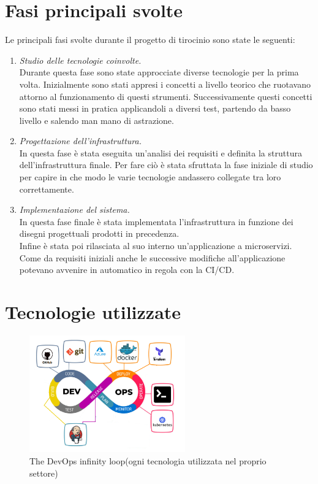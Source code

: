 \documentclass[a4paper,12pt]{report}
\begin{document}
\section{Fasi principali svolte}
Le principali fasi svolte durante il progetto di tirocinio sono state le seguenti:
\begin{enumerate}
\item \textit{Studio delle tecnologie coinvolte.} \\
Durante questa fase sono state approcciate diverse tecnologie per la prima volta. Inizialmente sono stati appresi i concetti a livello teorico che ruotavano attorno al funzionamento di questi strumenti. Successivamente questi concetti sono stati messi in pratica applicandoli a diversi test, partendo da basso livello e salendo man mano di astrazione.\\
\item \textit{Progettazione dell'infrastruttura.} \\
In questa fase è stata eseguita un'analisi dei requisiti e definita la struttura dell'infrastruttura finale. Per fare ciò è stata sfruttata la fase iniziale di studio per capire in che modo le varie tecnologie andassero collegate tra loro correttamente.
\item \textit{Implementazione del sistema.}\\
In questa fase finale è stata implementata l'infrastruttura in funzione dei disegni progettuali prodotti in precedenza.\\
Infine è stata poi rilasciata al suo interno un'applicazione a microservizi. \\
Come da requisiti iniziali anche le successive modifiche all'applicazione potevano avvenire in automatico in regola con la CI/CD. \\
\end{enumerate}

\section{Tecnologie utilizzate}
\begin{figure}[h]
	\includegraphics[width=0.6\textwidth]{tech_used}
    \caption{The DevOps infinity loop(ogni tecnologia utilizzata nel proprio settore) \cite{devopsloopimg}}
    \label{fig:tech_used}
\end{figure}
\end{document}

